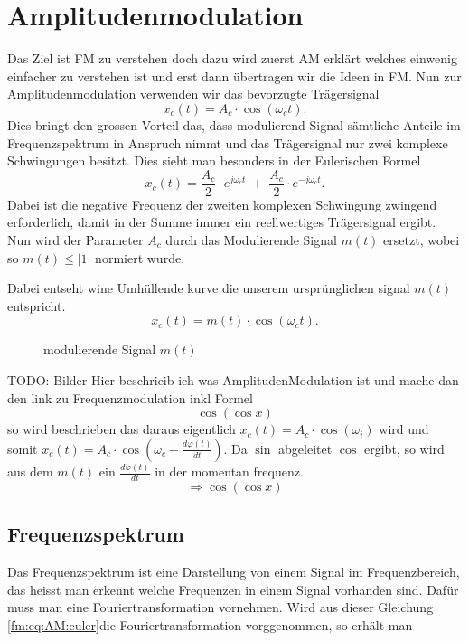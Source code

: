 %
%
%
\section{Amplitudenmodulation\label{fm:section:teil0}}

Das Ziel ist FM zu verstehen doch dazu wird zuerst AM erklärt welches einwenig einfacher zu verstehen ist und erst dann übertragen wir die Ideen in FM.
Nun zur Amplitudenmodulation verwenden wir das bevorzugte Trägersignal
\[
    x_c(t) = A_c \cdot \cos(\omega_ct).
\]
Dies bringt den grossen Vorteil das, dass modulierend Signal sämtliche Anteile im Frequenzspektrum in Anspruch nimmt 
und das Trägersignal nur zwei komplexe Schwingungen besitzt. 
Dies sieht man besonders in der Eulerischen Formel
\[
    x_c(t) = \frac{A_c}{2} \cdot e^{j\omega_ct}\;+\;\frac{A_c}{2} \cdot e^{-j\omega_ct}.
    \label{fm:eq:AM:euler}
\]
Dabei ist die negative Frequenz der zweiten komplexen Schwingung zwingend erforderlich, damit in der Summe immer ein reellwertiges Trägersignal ergibt.
Nun wird der Parameter \(A_c\) durch das  Modulierende Signal \(m(t)\) ersetzt, wobei so \(m(t) \leqslant |1|\) normiert wurde.

Dabei entseht wine Umhüllende kurve die unserem ursprünglichen signal \(m(t)\) entspricht.
\[
    x_c(t) = m(t) \cdot \cos(\omega_ct).
\]

\begin{figure}
	\centering
	
	\caption{modulierende Signal \(m(t)\)}
	\label{fig:bessel}
\end{figure}
%
TODO:
Bilder 
Hier beschrieib ich was AmplitudenModulation ist und mache dan den link zu Frequenzmodulation inkl Formel \[\cos( \cos x)\]
so wird beschrieben das daraus eigentlich \(x_c(t) = A_c \cdot \cos(\omega_i)\) wird und somit \(x_c(t) = A_c \cdot \cos(\omega_c + \frac{d \varphi(t)}{dt})\).
Da \(\sin \) abgeleitet \(\cos \) ergibt, so wird aus dem \(m(t)\) ein \( \frac{d \varphi(t)}{dt}\)  in der momentan frequenz. \[ \Rightarrow \cos( \cos x) \]
\subsection{Frequenzspektrum}
Das Frequenzspektrum ist eine Darstellung von einem Signal im Frequenzbereich, das heisst man erkennt welche Frequenzen in einem Signal vorhanden sind.
Dafür muss man eine Fouriertransformation vornehmen. 
Wird aus dieser Gleichung \eqref{fm:eq:AM:euler}die Fouriertransformation vorggenommen, so erhält man


